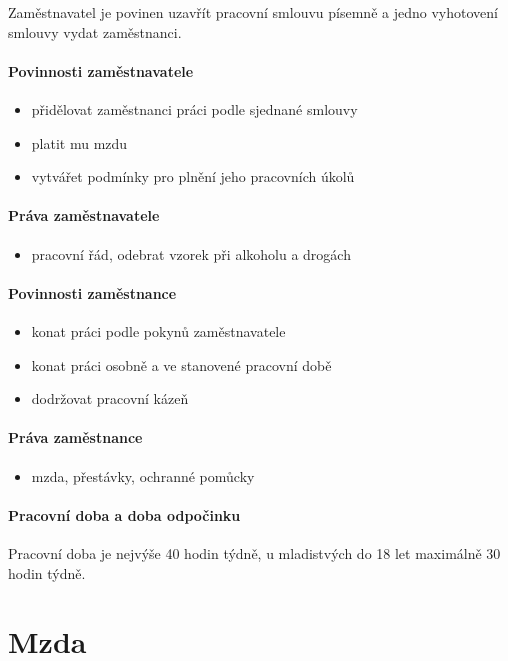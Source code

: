 Zaměstnavatel je povinen uzavřít pracovní smlouvu písemně a jedno vyhotovení smlouvy vydat zaměstnanci.

\paragraph*{Povinnosti zaměstnavatele}
\begin{itemize}
    \item přidělovat zaměstnanci práci podle sjednané smlouvy
    \item platit mu mzdu
    \item vytvářet podmínky pro plnění jeho pracovních úkolů
\end{itemize}

\paragraph*{Práva zaměstnavatele}
\begin{itemize}
    \item pracovní řád, odebrat vzorek při alkoholu a drogách	
\end{itemize}

\paragraph*{Povinnosti zaměstnance}
\begin{itemize}
    \item konat práci podle pokynů zaměstnavatele
    \item konat práci osobně a ve stanovené pracovní době
    \item dodržovat pracovní kázeň
\end{itemize}

\paragraph*{Práva zaměstnance}
\begin{itemize}
    \item mzda, přestávky, ochranné pomůcky	
\end{itemize}

\paragraph*{Pracovní doba a doba odpočinku}
Pracovní doba je nejvýše 40 hodin týdně, u mladistvých do 18 let maximálně 30 hodin týdně.

\section*{Mzda}

